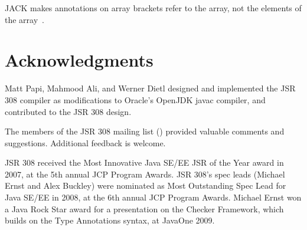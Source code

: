 \documentclass[10pt]{article}
\begin{document}
JACK makes annotations on array brackets refer to the array, not the
elements of the array~\cite{MalePPD2008}.


\section*{Acknowledgments}

Matt Papi, Mahmood Ali, and Werner Dietl designed and implemented the JSR 308 compiler as
modifications to Oracle's OpenJDK javac compiler, and contributed to the JSR
308 design.

The members of the JSR 308 mailing list
() provided
valuable comments and suggestions.
%
Additional feedback is welcome.

JSR 308 received
the Most Innovative Java SE/EE JSR of the Year award in 2007,
at the 5th annual JCP Program Awards.
JSR 308's spec leads (Michael
Ernst and Alex Buckley) were nominated as Most Outstanding Spec Lead for
Java SE/EE in 2008, at the 6th annual JCP Program Awards.
Michael Ernst won a Java Rock Star award for a presentation on the Checker
Framework, which builds on the Type Annotations syntax, at JavaOne 2009.







\end{document}
